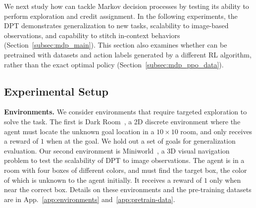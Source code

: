 \documentclass{article}
\begin{document}
We next study how \macroName{} can tackle Markov decision processes by testing its ability to perform exploration and credit assignment. In the following experiments, the DPT demonstrates generalization to new tasks, scalability to image-based observations, and capability to stitch in-context behaviors (Section~\ref{subsec:mdp_main}). This section also examines whether \macroName{} can be pretrained with datasets and action labels generated by a different RL algorithm, rather than the exact optimal policy (Section~\ref{subsec:mdp_ppo_data}).

\subsection{Experimental Setup}

\textbf{Environments. } We consider environments that require targeted exploration to solve the task. The first is Dark Room~\citep{zintgraf2019varibad,laskin2022context}, a 2D discrete environment where the agent must locate the unknown goal location in a $10 \times 10$ room, 
and only receives a reward of $1$ when at the goal. We hold out a set of goals for generalization evaluation. 
Our second environment is Miniworld~\citep{chevalier2018miniworld}, a 3D visual navigation problem to test the scalability of DPT to image observations. The agent is in a room with four boxes of different colors, and must find the target box, the color of which is unknown to the agent initially. It receives a reward of $1$ only when near the correct box.
Details on these environments and the pre-training datasets 
are in App.~\ref{app:environments} and~\ref{app:pretrain-data}.
\end{document}
